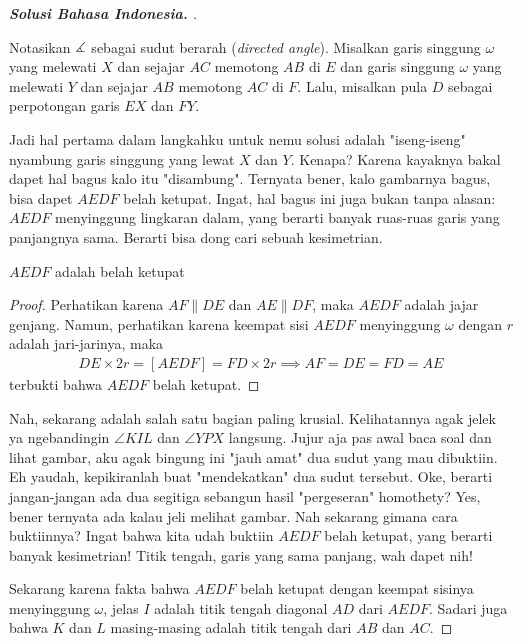 \documentclass[letterpaper, 13pt]{scrartcl}
\begin{document}
\begin{proof}[\textbf{Solusi Bahasa Indonesia. }]
\begin{center}
\begin{tikzpicture}[scale=3, dot/.style={circle, fill, inner sep=0.5pt, outer sep=0pt}]
    \end{tikzpicture}
\end{center}

Notasikan $\measuredangle$ sebagai sudut berarah (\textit{directed angle}).
Misalkan garis singgung $\omega$ yang melewati $X$ dan sejajar $AC$ memotong $AB$ di $E$ dan garis singgung $\omega$ yang melewati $Y$ dan sejajar $AB$ memotong $AC$ di $F$. Lalu, misalkan pula $D$ sebagai perpotongan garis $EX$ dan $FY$.

\begin{remark*}
    Jadi hal pertama dalam langkahku untuk nemu solusi adalah "iseng-iseng" nyambung garis singgung yang lewat $X$ dan $Y$. Kenapa? Karena kayaknya bakal dapet hal bagus kalo itu "disambung". Ternyata bener, kalo gambarnya bagus, bisa dapet $AEDF$ belah ketupat. Ingat, hal bagus ini juga bukan tanpa alasan: $AEDF$ menyinggung lingkaran dalam, yang berarti banyak ruas-ruas garis yang panjangnya sama. Berarti bisa dong cari sebuah kesimetrian.
\end{remark*}
\begin{lemmarev}
    $AEDF$ adalah belah ketupat
    \begin{proof}
        Perhatikan karena $AF \parallel DE$ dan $AE \parallel DF$, maka $AEDF$ adalah jajar genjang. Namun, perhatikan karena keempat sisi $AEDF$ menyinggung $\omega$ dengan $r$ adalah jari-jarinya, maka
        \begin{align*}
            DE \times 2r = [AEDF] = FD \times 2r \implies AF =DE = FD = AE 
        \end{align*}
        terbukti bahwa $AEDF$ belah ketupat.
    \end{proof}
\end{lemmarev}

\begin{remark*}
    Nah, sekarang adalah salah satu bagian paling krusial. Kelihatannya agak jelek ya ngebandingin $\angle KIL$ dan $\angle YPX$ langsung. Jujur aja pas awal baca soal dan lihat gambar, aku agak bingung ini "jauh amat" dua sudut yang mau dibuktiin. Eh yaudah, kepikiranlah buat "mendekatkan" dua sudut tersebut. Oke, berarti jangan-jangan ada dua segitiga sebangun hasil "pergeseran" homothety? Yes, bener ternyata ada kalau jeli melihat gambar. Nah sekarang gimana cara buktiinnya? Ingat bahwa kita udah buktiin $AEDF$ belah ketupat, yang berarti banyak kesimetrian! Titik tengah, garis yang sama panjang, wah dapet nih!
\end{remark*}

Sekarang karena fakta bahwa $AEDF$ belah ketupat dengan keempat sisinya menyinggung $\omega$, jelas $I$ adalah titik tengah diagonal $AD$ dari $AEDF$. Sadari juga bahwa $K$ dan $L$ masing-masing adalah titik tengah dari $AB$ dan $AC$.


\end{proof}
\end{document}

